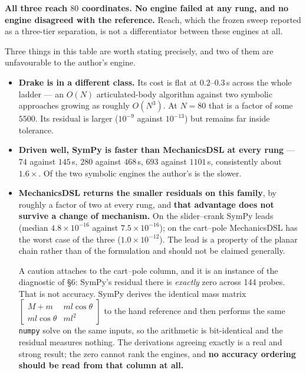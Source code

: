 \documentclass[11pt,a4paper]{article}
\begin{document}
\noindent \textbf{All three reach $80$ coordinates. No engine failed at any rung,
and no engine disagreed with the reference.} Reach, which the frozen sweep
reported as a three-tier separation, is not a differentiator between these
engines at all.

Three things in this table are worth stating precisely, and two of them are
unfavourable to the author's engine.

\begin{itemize}[leftmargin=1.4em,itemsep=0.3em]
  \item \textbf{Drake is in a different class.} Its cost is flat at
        $0.2$--$0.3$\,s across the whole ladder --- an $O(N)$ articulated-body
        algorithm against two symbolic approaches growing as roughly $O(N^3)$.
        At $N=80$ that is a factor of some $5500$. Its residual is larger
        ($10^{-9}$ against $10^{-13}$) but remains far inside tolerance.
  \item \textbf{Driven well, SymPy is faster than MechanicsDSL at every
        rung} --- $74$ against $145$\,s, $280$ against $468$\,s, $693$
        against $1101$\,s, consistently about $1.6\times$. Of the two symbolic
        engines the author's is the slower.
  \item \textbf{MechanicsDSL returns the smaller residuals on this family},
        by roughly a factor of two at every rung, and \textbf{that advantage does
        not survive a change of mechanism.} On the slider--crank SymPy leads
        (median $4.8\times10^{-16}$ against $7.5\times10^{-16}$); on the cart--pole
        MechanicsDSL has the worst case of the three ($1.0\times10^{-12}$).
        The lead is a property of the planar chain rather than of the
        formulation and should not be claimed generally.

        A caution attaches to the cart--pole column, and it is an instance of
        the diagnostic of \S6: SymPy's residual there is \emph{exactly} zero
        across 144 probes. That is not accuracy. SymPy derives the identical
        mass matrix $\left[\begin{smallmatrix} M{+}m & ml\cos\theta \\ ml\cos\theta & ml^2\end{smallmatrix}\right]$ to
        the hand reference and then performs the same \texttt{numpy} solve on the
        same inputs, so the arithmetic is bit-identical and the residual measures
        nothing. The derivations agreeing exactly is a real and strong result;
        the zero cannot rank the engines, and \textbf{no accuracy ordering should
        be read from that column at all.}
\end{itemize}
\end{document}
